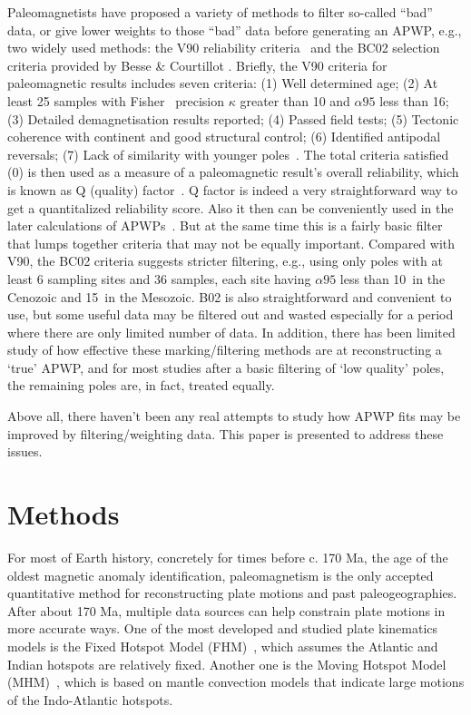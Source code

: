 Paleomagnetists have proposed a variety of methods to filter so-called ``bad''
data, or give lower weights to those ``bad'' data before generating an APWP,
e.g., two widely used methods: the V90 reliability criteria~\cite{v90} and the
BC02 selection criteria provided by Besse \& Courtillot .
Briefly, the V90 criteria for paleomagnetic results includes seven criteria: (1)
Well determined age; (2) At least 25 samples with Fisher~\cite{F53} precision
$\kappa$ greater than 10 and $\alpha95$ less than 16\degree; (3) Detailed
demagnetisation results reported; (4) Passed field tests; (5) Tectonic coherence
with continent and good structural control; (6) Identified antipodal reversals;
(7) Lack of similarity with younger poles~\cite{T92}. The total criteria
satisfied (0) is then used as a measure of a paleomagnetic result's
overall reliability, which is known as Q (quality) factor~\cite{T92}. Q factor
is indeed a very straightforward way to get a quantitalized reliability score.
Also it then can be conveniently used in the later calculations of
APWPs~\cite{T92}. But at the same time this is a fairly basic filter that lumps
together criteria that may not be equally important. Compared with V90, the BC02
criteria suggests stricter filtering, e.g., using only poles with at least 6
sampling sites and 36 samples, each site having $\alpha95$ less than 10\degree\
in the Cenozoic and 15\degree\ in the Mesozoic. B02 is also straightforward and
convenient to use, but some useful data may be filtered out and wasted
especially for a period where there are only limited number of data. In
addition, there has been limited study of how effective these marking/filtering
methods are at reconstructing a `true' APWP, and for most studies after a basic
filtering of `low quality' poles, the remaining poles are, in fact, treated
equally.

Above all, there haven't been any real attempts to study how APWP fits may be
improved by filtering/weighting data. This paper is presented to address these
issues.


\section{Methods}

For most of Earth history, concretely for times before c. 170 Ma, the age of the
oldest magnetic anomaly identification, paleomagnetism is the only accepted
quantitative method for reconstructing plate motions and past paleogeographies.
After about 170 Ma, multiple data sources can help constrain plate motions in
more accurate ways. One of the most developed and studied plate kinematics
models is the Fixed Hotspot Model (FHM)~\cite{M93,M99}, which assumes the
Atlantic and Indian hotspots are relatively fixed. Another one is the Moving
Hotspot Model (MHM)~\cite{O05}, which is based on mantle convection models that
indicate large motions of the Indo-Atlantic hotspots.

